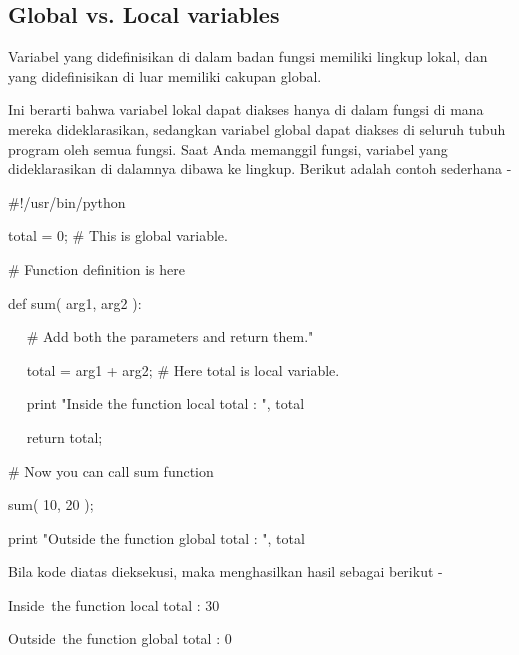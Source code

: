 \subsection{Global vs. Local variables }
\noindent 
Variabel yang didefinisikan di dalam badan fungsi memiliki lingkup lokal, dan yang didefinisikan di luar memiliki cakupan global. \par
\noindent 
Ini berarti bahwa variabel lokal dapat diakses hanya di dalam fungsi di mana mereka dideklarasikan, sedangkan variabel global dapat diakses di seluruh tubuh program oleh semua fungsi. Saat Anda memanggil fungsi, variabel yang dideklarasikan di dalamnya dibawa ke lingkup. Berikut adalah contoh sederhana - \par
\vspace{\baselineskip}
\noindent 
 \hspace*{0.5in}  $  \#  $!/usr/bin/python \par
\vspace{12pt}
\noindent 
 \hspace*{0.5in} total = 0;  $  \#  $ This is global variable. \par
\noindent 
 \hspace*{0.5in}  $  \#  $ Function definition is here \par
\noindent 
 \hspace*{0.5in} def sum( arg1, arg2 ): \par
 \vspace{\baselineskip}
\noindent 
 \hspace*{0.5in} ~~  $  \#  $ Add both the parameters and return them." \par
\noindent 
 \hspace*{0.5in} ~~ total = arg1 + arg2;  $  \#  $ Here total is local variable. \par
\noindent 
 \hspace*{0.5in} ~~ print "Inside the function local total : ", total \par
\noindent 
 \hspace*{0.5in} ~~ return total; \par
\noindent 
 \hspace*{0.5in} \vspace{12pt}
\noindent 
 \hspace*{0.5in}  $  \#  $ Now you can call sum function \par
\noindent 
 \hspace*{0.5in} sum( 10, 20 ); \par
\noindent 
 \hspace*{0.5in} print "Outside the function global total : ", total  \par
\vspace{\baselineskip}
\noindent 
Bila kode diatas dieksekusi, maka menghasilkan hasil sebagai berikut - \par
\noindent 
 \hspace*{0.5in} Inside~the function local total :  30 \par
\noindent 
 \hspace*{0.5in} Outside~the function global total :  0 \par
 \vspace{\baselineskip}
 \vspace{\baselineskip}
 
